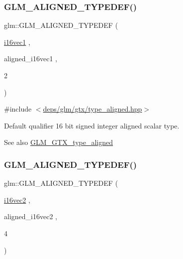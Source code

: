 \subsubsection{\texorpdfstring{G\+L\+M\+\_\+\+A\+L\+I\+G\+N\+E\+D\+\_\+\+T\+Y\+P\+E\+D\+E\+F()}{GLM\_ALIGNED\_TYPEDEF()}\hspace{0.1cm}{\footnotesize\ttfamily [57/209]}}
{\footnotesize\ttfamily glm\+::\+G\+L\+M\+\_\+\+A\+L\+I\+G\+N\+E\+D\+\_\+\+T\+Y\+P\+E\+D\+EF (\begin{DoxyParamCaption}\item[{\hyperlink{group__gtc__type__precision_ga51ac9cc5aa60aa41bf37ccbf900db94f}{i16vec1}}]{,  }\item[{aligned\+\_\+i16vec1}]{,  }\item[{2}]{ }\end{DoxyParamCaption})}



{\ttfamily \#include $<$\hyperlink{gtx_2type__aligned_8hpp}{deps/glm/gtx/type\+\_\+aligned.\+hpp}$>$}

Default qualifier 16 bit signed integer aligned scalar type. \begin{DoxySeeAlso}{See also}
\hyperlink{group__gtx__type__aligned}{G\+L\+M\+\_\+\+G\+T\+X\+\_\+type\+\_\+aligned} 
\end{DoxySeeAlso}
\mbox{\label{group__gtx__type__aligned_ga9d7cb211ccda69b1c22ddeeb0f3e7aba}} 
\subsubsection{\texorpdfstring{G\+L\+M\+\_\+\+A\+L\+I\+G\+N\+E\+D\+\_\+\+T\+Y\+P\+E\+D\+E\+F()}{GLM\_ALIGNED\_TYPEDEF()}\hspace{0.1cm}{\footnotesize\ttfamily [58/209]}}
{\footnotesize\ttfamily glm\+::\+G\+L\+M\+\_\+\+A\+L\+I\+G\+N\+E\+D\+\_\+\+T\+Y\+P\+E\+D\+EF (\begin{DoxyParamCaption}\item[{\hyperlink{group__gtc__type__precision_gad912fd04abb876a5b806118ec6e0f283}{i16vec2}}]{,  }\item[{aligned\+\_\+i16vec2}]{,  }\item[{4}]{ }\end{DoxyParamCaption})}



